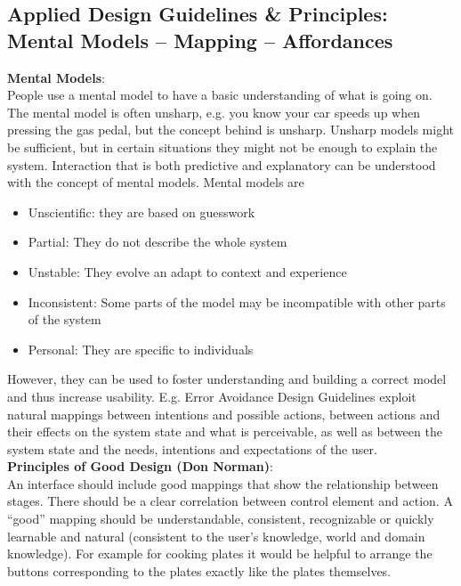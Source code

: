 \subsection{Applied Design Guidelines \& Principles: Mental Models -- Mapping -- Affordances}
\textbf{Mental Models}: \\
People use a mental model to have a basic understanding of what is going on. The mental model is often unsharp, e.g. you know your car speeds up when pressing the gas pedal, but the concept behind is unsharp. Unsharp models might be sufficient, but in certain situations they might not be enough to explain the system. Interaction that is both predictive and explanatory can be understood with the concept of mental models. Mental models are
\begin{itemize}
\item Unscientific: they are based on guesswork
\item Partial: They do not describe the whole system
\item Unstable: They evolve an adapt to context and experience
\item Inconsistent: Some parts of the model may be incompatible with other parts of the system
\item Personal: They are specific to individuals
\end{itemize}
However, they can be used to foster understanding and building a correct model and thus increase usability. E.g. Error Avoidance Design Guidelines exploit natural mappings between intentions and possible actions, between actions and their effects on the system state and what is perceivable, as well as between the system state and the needs, intentions and expectations of the user.\\

\textbf{Principles of Good Design (Don Norman)}:\\
An interface should include good mappings that show the relationship between stages. There should be a clear correlation between control element and action. A ``good'' mapping should be understandable, consistent, recognizable or quickly learnable and natural (consistent to the user's knowledge, world and domain knowledge). For example for cooking plates it would be helpful to arrange the buttons corresponding to the plates exactly like the plates themselves.\\ \\

